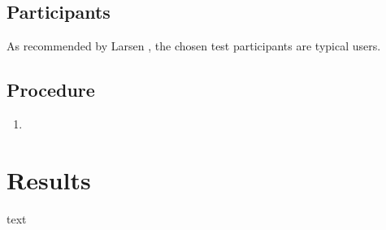 \subsection{Participants}
As recommended by Larsen \citep{TestingLecture}, the chosen test participants are typical users.

\subsection{Procedure}
\begin{enumerate}
\item 
\end{enumerate}

\section{Results}
text